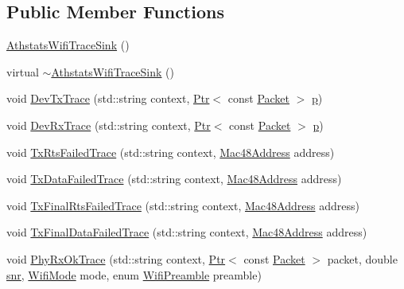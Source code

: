 \subsection*{Public Member Functions}
\begin{DoxyCompactItemize}
\item 
\hyperlink{classns3_1_1AthstatsWifiTraceSink_af5b6796802471705248b595f58d58e7a}{Athstats\+Wifi\+Trace\+Sink} ()
\item 
virtual \hyperlink{classns3_1_1AthstatsWifiTraceSink_abfe299be0c64eeab1cbaaf34e0745be7}{$\sim$\+Athstats\+Wifi\+Trace\+Sink} ()
\item 
void \hyperlink{classns3_1_1AthstatsWifiTraceSink_a819944bc5c793fb4f8b0a50f9bcc9ad9}{Dev\+Tx\+Trace} (std\+::string context, \hyperlink{classns3_1_1Ptr}{Ptr}$<$ const \hyperlink{classns3_1_1Packet}{Packet} $>$ \hyperlink{lte__link__budget__x2__handover__measures_8m_ac9de518908a968428863f829398a4e62}{p})
\item 
void \hyperlink{classns3_1_1AthstatsWifiTraceSink_a3caa61a03112c38a690562a97eff88e0}{Dev\+Rx\+Trace} (std\+::string context, \hyperlink{classns3_1_1Ptr}{Ptr}$<$ const \hyperlink{classns3_1_1Packet}{Packet} $>$ \hyperlink{lte__link__budget__x2__handover__measures_8m_ac9de518908a968428863f829398a4e62}{p})
\item 
void \hyperlink{classns3_1_1AthstatsWifiTraceSink_a676a029bed40984ff0e03b1ff60528a6}{Tx\+Rts\+Failed\+Trace} (std\+::string context, \hyperlink{classns3_1_1Mac48Address}{Mac48\+Address} address)
\item 
void \hyperlink{classns3_1_1AthstatsWifiTraceSink_abc308a4d8b65afc5775cf4001515909c}{Tx\+Data\+Failed\+Trace} (std\+::string context, \hyperlink{classns3_1_1Mac48Address}{Mac48\+Address} address)
\item 
void \hyperlink{classns3_1_1AthstatsWifiTraceSink_a029bc1c199f7331467a57d3e304e0981}{Tx\+Final\+Rts\+Failed\+Trace} (std\+::string context, \hyperlink{classns3_1_1Mac48Address}{Mac48\+Address} address)
\item 
void \hyperlink{classns3_1_1AthstatsWifiTraceSink_a29e9dddeb7bd821037a2ff8edeba1353}{Tx\+Final\+Data\+Failed\+Trace} (std\+::string context, \hyperlink{classns3_1_1Mac48Address}{Mac48\+Address} address)
\item 
void \hyperlink{classns3_1_1AthstatsWifiTraceSink_ad3543beb6f37c802b7bf53560adc9413}{Phy\+Rx\+Ok\+Trace} (std\+::string context, \hyperlink{classns3_1_1Ptr}{Ptr}$<$ const \hyperlink{classns3_1_1Packet}{Packet} $>$ packet, double \hyperlink{lte__pathloss_8m_ae6e82a215dff6b79fb6e9952a1b78453}{snr}, \hyperlink{classns3_1_1WifiMode}{Wifi\+Mode} mode, enum \hyperlink{group__wifi_ga5e94a56cb338a14ffbbb19c6a41251eb}{Wifi\+Preamble} preamble)

\end{DoxyCompactItemize}

